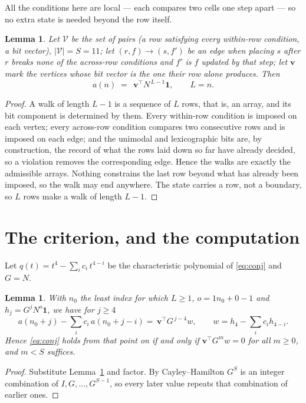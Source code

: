 \documentclass[11pt,a4paper]{article}
\theoremstyle{plain}
\newtheorem{lemma}[theorem]{Lemma}
\theoremstyle{definition}
\begin{document}
All the conditions here are local --- each compares two cells one step apart ---
so no extra state is needed beyond the row itself.

\begin{lemma}\label{lem:walk}
Let $\mathcal V$ be the set of pairs (a row satisfying every within-row condition, a
bit vector), $|\mathcal V|=S=11$; let $(r,f)\to(s,f')$ be an edge when placing $s$ after $r$
breaks none of the across-row conditions and $f'$ is $f$ updated by that step; let
$\mathbf{v}$ mark the vertices whose bit vector is the one their row alone produces.
Then
\[
a(n)\;=\;\,\mathbf{v}^{\!\top}N^{\,L-1}\mathbf{1},\qquad L=n.
\]
\end{lemma}

\begin{proof}
A walk of length $L-1$ is a sequence of $L$ rows, that is, an array, and its bit component
is determined by them. Every within-row condition is imposed on each vertex; every
across-row condition compares two consecutive rows and is imposed on each edge; and the
unimodal and lexicographic bits are, by construction, the record of what the rows laid down
so far have already decided, so a violation removes the corresponding edge. Hence the walks
are exactly the admissible arrays. Nothing constrains the last row beyond what has already
been imposed, so the walk may end anywhere. The state carries a row, not a boundary, so
$L$ rows make a walk of length $L-1$.
\end{proof}

\section{The criterion, and the computation}

Let $q(t)=t^{4}-\sum_i c_i\,t^{4-i}$ be the characteristic polynomial of
\eqref{eq:conj} and $G=N$.

\begin{lemma}\label{lem:crit}
With $n_0$ the least index for which $L\ge1$, $o=1n_0+0-1$ and
$h_j=G^{j}N^{o}\mathbf{1}$, we have for $j\ge4$
\[
a(n_0+j)-\sum_i c_i\,a(n_0+j-i)=\,\mathbf{v}^{\!\top}G^{\,j-4}w,
\qquad w=h_{4}-\sum_i c_ih_{4-i} .
\]
Hence \eqref{eq:conj} holds from that point on if and only if
$\mathbf{v}^{\!\top}G^{m}w=0$ for all $m\ge0$, and $m<S$ suffices.
\end{lemma}

\begin{proof}
Substitute Lemma~\ref{lem:walk} and factor. By Cayley--Hamilton $G^{S}$ is an integer
combination of $I,G,\dots,G^{S-1}$, so every later value repeats that combination of
earlier ones.
\end{proof}
\end{document}
